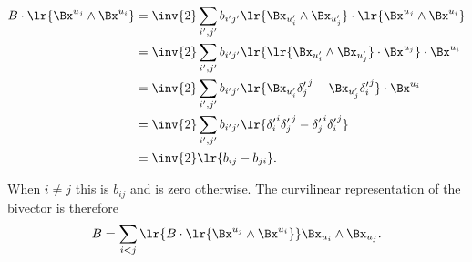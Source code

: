 \begin{equation}\label{eqn:curvilinear:340}
\begin{aligned}
B \cdot \lr{ \Bx^{u_j} \wedge \Bx^{u_i} }
&= \inv{2} \sum_{i' , j'} b_{i'j'} \lr{ \Bx_{u_i'} \wedge \Bx_{u_j'} } \cdot \lr{ \Bx^{u_j} \wedge \Bx^{u_i} } \\
&= \inv{2} \sum_{i' , j'} b_{i'j'} \lr{ \lr{ \Bx_{u_i'} \wedge \Bx_{u_j'} } \cdot \Bx^{u_j} } \cdot \Bx^{u_i} \\
&= \inv{2} \sum_{i' , j'} b_{i'j'} \lr{  \Bx_{u_i'} {\delta_j'}^j - \Bx_{u_j'} {\delta_i'}^j } \cdot \Bx^{u_i} \\
&= \inv{2} \sum_{i' , j'} b_{i'j'} \lr{  {\delta_i'}^i {\delta_j'}^j - {\delta_j'}^i {\delta_i'}^j } \\
&= \inv{2} \lr{ b_{i j} - b_{ji} }.
\end{aligned}
\end{equation}

When \( i \ne j \) this is \( b_{ij} \) and is zero otherwise.  The curvilinear representation of the bivector is therefore
\begin{equation}\label{eqn:curvilinear:400}
B = \sum_{i < j} \lr{ B \cdot \lr{ \Bx^{u_j} \wedge \Bx^{u_i} }} \Bx_{u_i} \wedge \Bx_{u_j}.
\end{equation}
